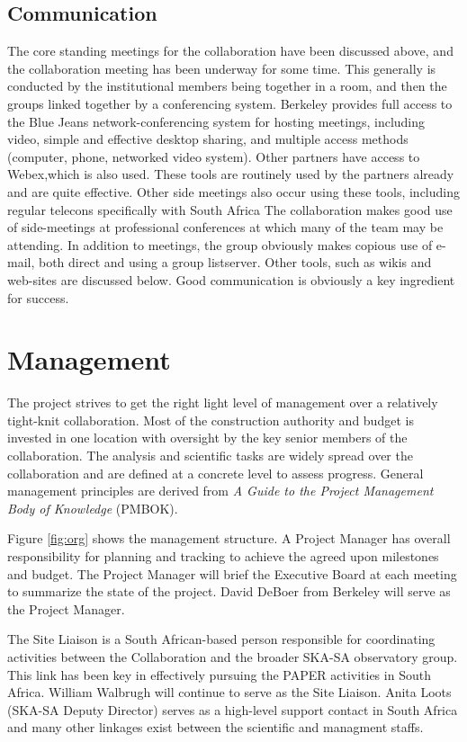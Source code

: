 \documentclass[preprint]{aastex}
\begin{document}
\subsection{Communication}
The core standing meetings for the collaboration have been discussed above, and the
collaboration meeting has been underway for some time. This generally is
conducted by the institutional members being together in a room, and then the groups linked together by a
conferencing system. Berkeley provides full access to the Blue Jeans
network-conferencing system for hosting meetings, including video, simple and
effective desktop sharing, and multiple access methods (computer, phone, networked
video system). Other partners have access to Webex,which is also used. These tools
are routinely used by the partners already and are quite effective.
Other side meetings also occur using these tools, including regular telecons
specifically with South Africa The collaboration makes good use of side-meetings at
professional conferences at which many of the team may be attending.
In addition to meetings, the group obviously makes copious use of e-mail, both direct 
and using a group listserver.  Other tools, such as wikis and web-sites are discussed below.
Good communication is obviously a key ingredient for success.

\section{Management}
The project strives to get the right light level of management over a relatively tight-knit
collaboration.  Most of the construction authority and budget is invested in one location
with oversight by the key senior members of the collaboration.  The analysis and 
scientific tasks are widely spread over the collaboration and are defined at a 
concrete level to assess progress.  General management principles are derived from
{\it A Guide to the Project Management Body of Knowledge} (PMBOK).

Figure \ref{fig:org} shows the management structure.   A Project Manager has
overall responsibility for planning and tracking to achieve the agreed upon
milestones and budget. The Project Manager will brief the Executive Board at each
meeting to summarize the state of the project.  David DeBoer from Berkeley will serve
as the Project Manager.

The Site Liaison is a South African-based person responsible for coordinating activities
between the Collaboration and the broader SKA-SA observatory group.  This link has 
been key in effectively pursuing the PAPER activities in South Africa.  William Walbrugh
will continue to serve as the Site Liaison.  Anita Loots (SKA-SA Deputy Director) serves as a high-level
support contact in South Africa and many other linkages exist between the scientific and managment staffs.
\end{document}
